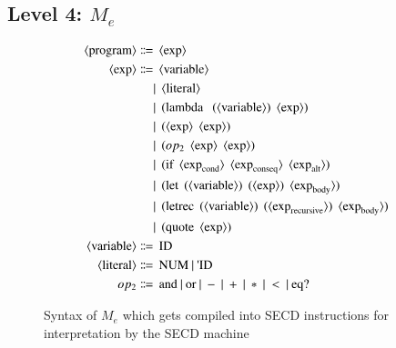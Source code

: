 \documentclass[a4paper,12pt,twoside,openright]{report}
\theoremstyle{definition}
\newcommand{\ts}{\textquotesingle}
\newcommand{\mevl}{$M_{e}$}
\begin{document}
\newpage
\subsection{Level 4: \texorpdfstring{\mevl}{Lg}}\label{subsec:mevl}
\begin{figure}[ht!]
\begin{align*}
	\langle \text{program} \rangle \Coloneqq & \:\: \langle \text{exp} \rangle \\
	\langle \text{exp} \rangle \Coloneqq & \:\: \langle \text{variable} \rangle \\
															   & | \:\: \langle \text{literal} \rangle \\
															   & | \:\: \text{(lambda \: (} \langle \text{variable} \rangle\text{)} \:\: \langle \text{exp} \rangle\text{)} \\
															   & | \:\: \text{(} \langle \text{exp} \rangle \:\: \langle \text{exp} \rangle \text{)} \\
															   & | \:\: \text{(} op_{2} \:\: \langle \text{exp} \rangle \:\: \langle \text{exp} \rangle \text{)} \\
															   & | \:\: \text{(if} \:\: \langle \text{exp}_\text{cond} \rangle \:\: \langle \text{exp}_\text{conseq} \rangle \:\: \langle \text{exp}_\text{alt} \rangle \text{)} \\
															   & | \:\: \text{(let} \:\: \text{(} \langle \text{variable} \rangle \text{)} \:\: \text{(}\langle \text{exp} \rangle \text{)} \:\: \langle \text{exp}_\text{body} \rangle \text{)} \\
															   & | \:\: \text{(letrec} \:\: \text{(} \langle \text{variable} \rangle \text{)} \:\: \text{(}\langle \text{exp}_\text{recursive} \rangle \text{)} \:\: \langle \text{exp}_\text{body} \rangle \text{)} \\
															   & | \:\: \text{(quote} \:\: \langle \text{exp} \rangle \text{)} \\
	\langle \text{variable} \rangle \Coloneqq & \:\: \text{ID} \\
	\langle \text{literal} \rangle \Coloneqq & \:\: \text{NUM} \: | \: \text{{\ts}ID} \\
	op_{2} \Coloneqq & \:\: \text{and} \: | \: \text{or} \: | \: - \: | \: + \: | \: * \: | \: < \: | \: \text{eq?}
\end{align*}
\caption{Syntax of \mevl{} which gets compiled into SECD instructions for interpretation by the SECD machine}
\label{fig:mevl_syntax}
\end{figure}
\end{document}
